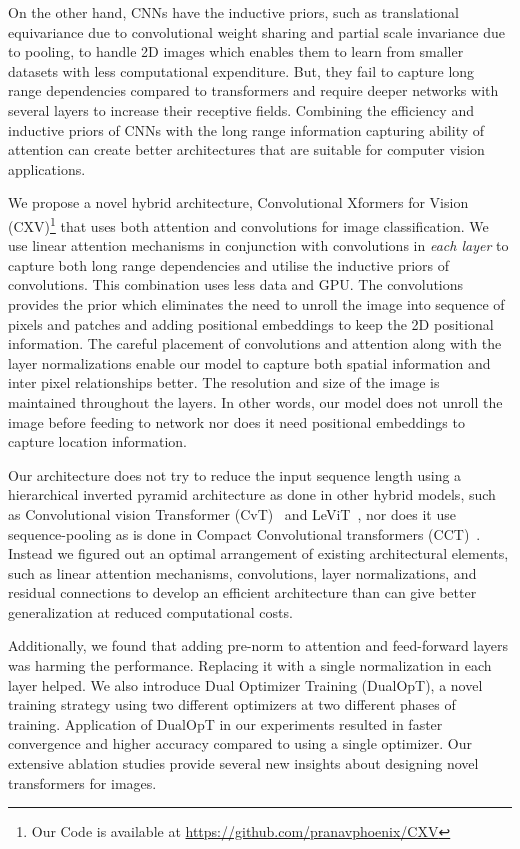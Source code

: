\documentclass{article}
\begin{document}
On the other hand, CNNs have the inductive priors, such as translational equivariance due to convolutional weight sharing and partial scale invariance due to pooling, to handle 2D images which enables them to learn from smaller datasets with less computational expenditure. But, they fail to capture long range dependencies compared to transformers and require deeper networks with several layers to increase their receptive fields. Combining the efficiency and inductive priors of CNNs with the long range information capturing ability of attention can create better architectures that are suitable for computer vision applications.

We propose a novel hybrid architecture, Convolutional Xformers for Vision (CXV)\footnote{Our Code is available at \href{https://github.com/pranavphoenix/CXV}{https://github.com/pranavphoenix/CXV}}  that uses both attention and convolutions for image classification. We use linear attention mechanisms in conjunction with convolutions in \emph{each layer} to capture both long range dependencies and utilise the inductive priors of convolutions. This combination uses less data and GPU. The convolutions provides the prior which eliminates the need to unroll the image into sequence of pixels and patches and adding positional  embeddings to keep the 2D positional information. The careful placement of convolutions and attention along with the layer normalizations enable our model to capture both spatial information and inter pixel relationships better. The resolution and size of the image is maintained throughout the layers. In other words, our model does not unroll the image before feeding to network nor does it need positional embeddings to capture location information.

Our architecture does not try to reduce the input sequence length using a hierarchical inverted pyramid architecture as done in other hybrid models, such as Convolutional vision Transformer (CvT)~\cite{wu2021cvt} and LeViT~\cite{graham2021levit}, nor does it use sequence-pooling as is done in Compact Convolutional transformers (CCT)~\cite{hassani2021escaping}. Instead we figured out an optimal arrangement of existing architectural elements, such as linear attention mechanisms, convolutions, layer normalizations, and residual connections to develop an efficient architecture than can give better generalization at reduced computational costs.

Additionally, we found that adding pre-norm to attention and feed-forward layers was harming the performance. Replacing it with a single normalization in each layer helped. We also introduce Dual Optimizer Training (DualOpT), a novel training strategy using two different optimizers at two different phases of training. Application of DualOpT in our experiments resulted in faster convergence and higher accuracy compared to using a single optimizer. Our extensive ablation studies provide several new insights about designing novel transformers for images.
\end{document}
